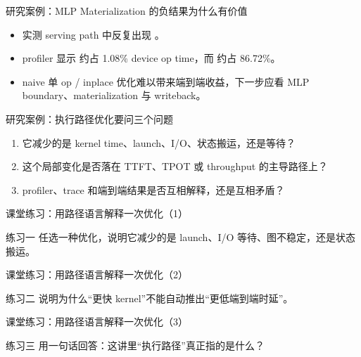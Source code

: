 \begin{frame}{研究案例：MLP Materialization 的负结果为什么有价值}
  \begin{itemize}
    \item 实测 serving path 中反复出现 \texttt{}。
    \item profiler 显示 \texttt{} 约占 1.08\% device op time，而 \texttt{} 约占 86.72\%。
    \item naive 单 op / inplace 优化难以带来端到端收益，下一步应看 MLP boundary、materialization 与 writeback。
  \end{itemize}
\end{frame}

\begin{frame}{研究案例：执行路径优化要问三个问题}
  \begin{enumerate}
    \item 它减少的是 kernel time、launch、I/O、状态搬运，还是等待？
    \item 这个局部变化是否落在 TTFT、TPOT 或 throughput 的主导路径上？
    \item profiler、trace 和端到端结果是否互相解释，还是互相矛盾？
  \end{enumerate}
\end{frame}

\begin{frame}{课堂练习：用路径语言解释一次优化（1）}
\begin{block}{练习一}
    任选一种优化，说明它减少的是 launch、I/O 等待、图不稳定，还是状态搬运。
  \end{block}
\end{frame}

\begin{frame}{课堂练习：用路径语言解释一次优化（2）}
\begin{block}{练习二}
    说明为什么“更快 kernel”不能自动推出“更低端到端时延”。
  \end{block}
\end{frame}

\begin{frame}{课堂练习：用路径语言解释一次优化（3）}
\begin{block}{练习三}
    用一句话回答：这讲里“执行路径”真正指的是什么？
  \end{block}
\end{frame}
